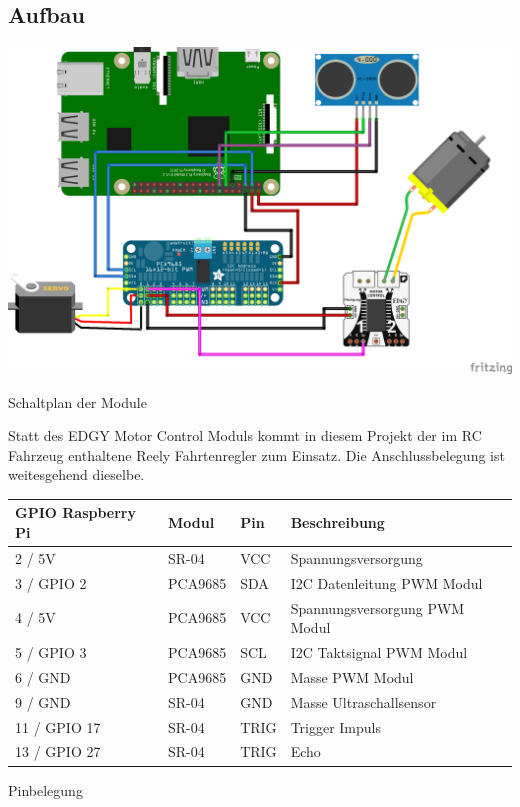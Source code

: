   \subsection{Aufbau}
    \begin{minipage}{\columnwidth}
      \makeatletter
      \def\@captype{figure}
      \makeatother
      \centering
      \includegraphics[width=1\linewidth]{images/hw_schematics.png}
      \caption{Schaltplan der Module}
      \label{fig:img-hw-06}
    \end{minipage}
    \vspace{1cm}

    \noindent
    Statt des EDGY Motor Control Moduls kommt in diesem Projekt der im RC
    Fahrzeug enthaltene Reely Fahrtenregler zum Einsatz. Die Anschlussbelegung
    ist weitesgehend dieselbe. \\

    \begin{minipage}{\columnwidth}
      \makeatletter
      \def\@captype{table}
      \makeatother
      \centering
      \begin{tabular}{l | l | l | l}
      GPIO Raspberry Pi & Modul & Pin & Beschreibung \\ \hline \hline
      2 / 5V & SR-04 & VCC & Spannungsversorgung \\
      3 / GPIO 2 & PCA9685 & SDA & I2C Datenleitung PWM Modul \\
      4 / 5V & PCA9685 & VCC & Spannungsversorgung PWM Modul \\
      5 / GPIO 3 & PCA9685 & SCL & I2C Taktsignal PWM Modul \\
      6 / GND & PCA9685 & GND & Masse PWM Modul \\
      9 / GND & SR-04 & GND & Masse Ultraschallsensor \\
      11 / GPIO 17 & SR-04 & TRIG & Trigger Impuls \\
      13 / GPIO 27 & SR-04 & TRIG & Echo \\
      
      \end{tabular}
      \caption{Pinbelegung}
      \label{tab:hw-01}
    \end{minipage}

